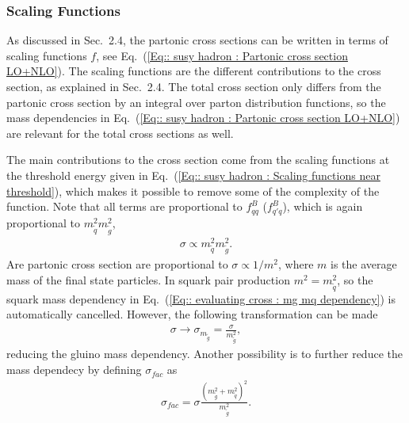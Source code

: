 \documentclass[twoside,english]{uiofysmaster}
\begin{document}
{\subsubsection{Scaling Functions}\label{Sec:: evaluating cross : Scaling Functions}

As discussed in Sec.~2.4, the partonic cross sections can be written in terms of scaling functions $f$, see Eq.~(\ref{Eq:: susy hadron : Partonic cross section LO+NLO}). The scaling functions are the different contributions to the cross section, as explained in Sec.~2.4. The total cross section only differs from the partonic cross section by an integral over parton distribution functions, so the mass dependencies in Eq.~(\ref{Eq:: susy hadron : Partonic cross section LO+NLO}) are relevant for the total cross sections as well.

The main contributions to the cross section come from the scaling functions at the threshold energy given in Eq.~(\ref{Eq:: susy hadron : Scaling functions near threshold}), which makes it possible to remove some of the complexity of the function. Note that all terms are proportional to $f_{qq}^B$ ($f_{q'q}^B$), which is again proportional to $m_{\widetilde{q}}^2 m_{\widetilde{g}}^2$,
\begin{align}\label{Eq:: evaluating cross : mg mq dependency}
\sigma \propto m_{\widetilde{q}}^2 m_{\widetilde{g}}^2.
\end{align}
 Are partonic cross section are proportional to $\sigma \propto 1/m^2$, where $m$ is the average mass of the final state particles. In squark pair production $m^2 = m_{\widetilde{q}}^2$, so the squark mass dependency in Eq.~(\ref{Eq:: evaluating cross : mg mq dependency}) is automatically cancelled. However, the following transformation can be made
\begin{align}
\sigma \rightarrow \sigma_{m_{\widetilde{g}}} = \frac{\sigma}{m_{\widetilde{g}}^2},
\end{align}
reducing the gluino mass dependency. Another possibility is to further reduce the mass dependecy by defining $\sigma_{fac}$ as 
\begin{align}
\sigma_{fac} = \sigma \frac{(m_{\widetilde{g}}^2 + m_{\widetilde{q}}^2)^2}{m_{\widetilde{g}}^2}.
\end{align}


}
\end{document}
